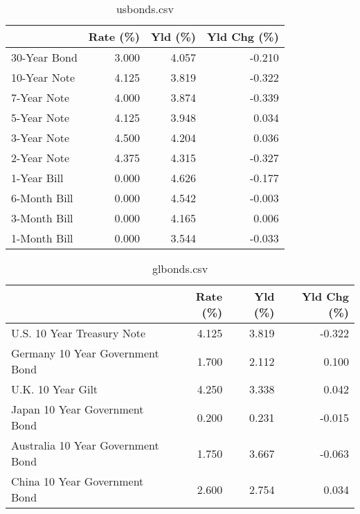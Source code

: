 \documentclass{article}%
\begin{document}
%


\begin{table}[htbp]%
\caption{usbonds.csv}%
\centering%
\begin{adjustbox}{width=1\textwidth}%
\begin{tabular}{lrrr}
\toprule
             &  Rate (\%) &  Yld (\%) &  Yld Chg (\%) \\
\midrule
30-Year Bond &     3.000 &    4.057 &       -0.210 \\
10-Year Note &     4.125 &    3.819 &       -0.322 \\
 7-Year Note &     4.000 &    3.874 &       -0.339 \\
 5-Year Note &     4.125 &    3.948 &        0.034 \\
 3-Year Note &     4.500 &    4.204 &        0.036 \\
 2-Year Note &     4.375 &    4.315 &       -0.327 \\
 1-Year Bill &     0.000 &    4.626 &       -0.177 \\
6-Month Bill &     0.000 &    4.542 &       -0.003 \\
3-Month Bill &     0.000 &    4.165 &        0.006 \\
1-Month Bill &     0.000 &    3.544 &       -0.033 \\
\bottomrule
\end{tabular}
%
\end{adjustbox}%
\end{table}

%


\begin{table}[htbp]%
\caption{glbonds.csv}%
\centering%
\begin{adjustbox}{width=1\textwidth}%
\begin{tabular}{lrrr}
\toprule
                                  &  Rate (\%) &  Yld (\%) &  Yld Chg (\%) \\
\midrule
       U.S. 10 Year Treasury Note &     4.125 &    3.819 &       -0.322 \\
  Germany 10 Year Government Bond &     1.700 &    2.112 &        0.100 \\
                U.K. 10 Year Gilt &     4.250 &    3.338 &        0.042 \\
    Japan 10 Year Government Bond &     0.200 &    0.231 &       -0.015 \\
Australia 10 Year Government Bond &     1.750 &    3.667 &       -0.063 \\
    China 10 Year Government Bond &     2.600 &    2.754 &        0.034 \\
\bottomrule
\end{tabular}
%
\end{adjustbox}%
\end{table}
\end{document}
